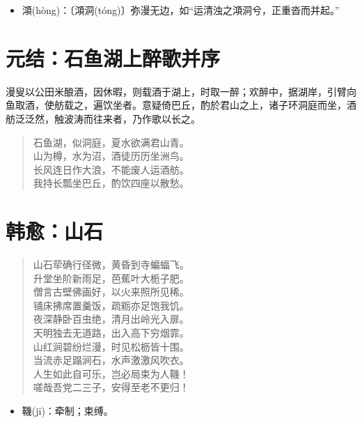 \documentclass[12pt,oneside]{book}
\newenvironment{shici}{%
\begin{verse}\centering\yanti\large\hspace{12pt}}{\end{verse}}
\begin{document}
\begin{common-format}
\begin{itemize}
\item 澒(hòng)：〔澒洞(tóng)〕弥漫无边，如“运清浊之澒洞兮，正重沓而并起。”
\end{itemize}

\chapter{元结：石鱼湖上醉歌并序}
漫叟以公田米酿酒，因休暇，则载酒于湖上，时取一醉；欢醉中，据湖岸，引臂向鱼取酒，使舫载之，遍饮坐者。意疑倚巴丘，酌於君山之上，诸子环洞庭而坐，酒舫泛泛然，触波涛而往来者，乃作歌以长之。

\begin{shici}
石鱼湖，似洞庭，夏水欲满君山青。\\
山为樽，水为沼，酒徒历历坐洲鸟。\\
长风连日作大浪，不能废人运酒舫。\\
我持长瓢坐巴丘，酌饮四座以散愁。
\end{shici}

\chapter{韩愈：山石}
\begin{shici}
山石荦确行径微，黄昏到寺蝙蝠飞。\\
升堂坐阶新雨足，芭蕉叶大栀子肥。\\
僧言古壁佛画好，以火来照所见稀。\\
铺床拂席置羹饭，疏粝亦足饱我饥。\\
夜深静卧百虫绝，清月出岭光入扉。\\
天明独去无道路，出入高下穷烟霏。\\
山红涧碧纷烂漫，时见松枥皆十围。\\
当流赤足蹋涧石，水声激激风吹衣。\\
人生如此自可乐，岂必局束为人鞿！\\
嗟哉吾党二三子，安得至老不更归！
\end{shici}

\begin{itemize}
\item 鞿(jī)：牵制；束缚。
\end{itemize}


\end{common-format}
\end{document}
